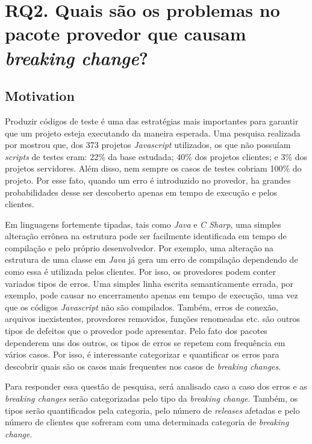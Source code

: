 \section{RQ2. Quais são os problemas no pacote provedor que causam \textit{breaking change}?}
\label{sec:rq2}

\subsection{Motivation}
\label{mot:rq2}

Produzir códigos de teste é uma das estratégias mais importantes para garantir que um projeto esteja executando da maneira esperada. Uma pesquisa realizada por  mostrou que, dos 373 projetos \textit{Javascript} utilizados, os que não possuíam \textit{scripts} de testes eram: 22\% da base estudada; 40\% dos projetos clientes; e 3\% dos projetos servidores. Além disso, nem sempre os casos de testes cobriam 100\% do projeto. Por esse fato, quando um erro é introduzido no provedor, ha grandes probabilidades desse ser descoberto apenas em tempo de execução e pelos clientes.

Em linguagens fortemente tipadas, tais como \textit{Java} e \textit{C Sharp}, uma simples alteração errônea na estrutura pode ser facilmente identificada em tempo de compilação e pelo próprio desenvolvedor. Por exemplo, uma alteração na estrutura de uma classe em \textit{Java} já gera um erro de compilação dependendo de como essa é utilizada pelos clientes. Por isso, os provedores podem conter variados tipos de erros. Uma simples linha escrita semanticamente errada, por exemplo, pode causar no encerramento apenas em tempo de execução, uma vez que os códigos \textit{Javascript} não são compilados. Também, erros de conexão, arquivos inexistentes, provedores removidos, funções renomeadas etc. são outros tipos de defeitos que o provedor pode apresentar. Pelo fato dos pacotes dependerem uns dos outros, os tipos de erros se repetem com frequência em vários casos. Por isso, é interessante categorizar e quantificar os erros para descobrir quais são os casos mais frequentes nos casos de \textit{breaking changes}.

Para responder essa questão de pesquisa, será analisado caso a caso dos erros e as \textit{breaking changes} serão categorizadas pelo tipo da \textit{breaking change}. Também, os tipos serão quantificados pela categoria, pelo número de \textit{releases} afetadas e pelo número de clientes que sofreram com uma determinada categoria de \textit{breaking change}.


